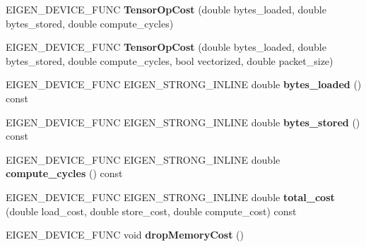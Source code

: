 \begin{DoxyCompactItemize}
E\+I\+G\+E\+N\+\_\+\+D\+E\+V\+I\+C\+E\+\_\+\+F\+U\+NC {\bfseries Tensor\+Op\+Cost} (double bytes\+\_\+loaded, double bytes\+\_\+stored, double compute\+\_\+cycles)
\item 
\mbox{\label{class_eigen_1_1_tensor_op_cost_acb9efb295137bd79a37936952247e5c3}} 
E\+I\+G\+E\+N\+\_\+\+D\+E\+V\+I\+C\+E\+\_\+\+F\+U\+NC {\bfseries Tensor\+Op\+Cost} (double bytes\+\_\+loaded, double bytes\+\_\+stored, double compute\+\_\+cycles, bool vectorized, double packet\+\_\+size)
\item 
\mbox{\label{class_eigen_1_1_tensor_op_cost_ab219b63415092d08e09310471cf6fc23}} 
E\+I\+G\+E\+N\+\_\+\+D\+E\+V\+I\+C\+E\+\_\+\+F\+U\+NC E\+I\+G\+E\+N\+\_\+\+S\+T\+R\+O\+N\+G\+\_\+\+I\+N\+L\+I\+NE double {\bfseries bytes\+\_\+loaded} () const
\item 
\mbox{\label{class_eigen_1_1_tensor_op_cost_a5d813f65797b15c9da19d23ae7ceb5eb}} 
E\+I\+G\+E\+N\+\_\+\+D\+E\+V\+I\+C\+E\+\_\+\+F\+U\+NC E\+I\+G\+E\+N\+\_\+\+S\+T\+R\+O\+N\+G\+\_\+\+I\+N\+L\+I\+NE double {\bfseries bytes\+\_\+stored} () const
\item 
\mbox{\label{class_eigen_1_1_tensor_op_cost_ac24758ad7deef1e3968f66eb33eaf139}} 
E\+I\+G\+E\+N\+\_\+\+D\+E\+V\+I\+C\+E\+\_\+\+F\+U\+NC E\+I\+G\+E\+N\+\_\+\+S\+T\+R\+O\+N\+G\+\_\+\+I\+N\+L\+I\+NE double {\bfseries compute\+\_\+cycles} () const
\item 
\mbox{\label{class_eigen_1_1_tensor_op_cost_ae7caee524a30c15d68c781ea5f063ead}} 
E\+I\+G\+E\+N\+\_\+\+D\+E\+V\+I\+C\+E\+\_\+\+F\+U\+NC E\+I\+G\+E\+N\+\_\+\+S\+T\+R\+O\+N\+G\+\_\+\+I\+N\+L\+I\+NE double {\bfseries total\+\_\+cost} (double load\+\_\+cost, double store\+\_\+cost, double compute\+\_\+cost) const
\item 
\mbox{\label{class_eigen_1_1_tensor_op_cost_ae309b668454a04ebbaaaf2dbcc623e08}} 
E\+I\+G\+E\+N\+\_\+\+D\+E\+V\+I\+C\+E\+\_\+\+F\+U\+NC void {\bfseries drop\+Memory\+Cost} ()
\item 
\mbox{\label{class_eigen_1_1_tensor_op_cost_a1ab887f487b37baa8808be9973f91297}} 

\end{DoxyCompactItemize}
